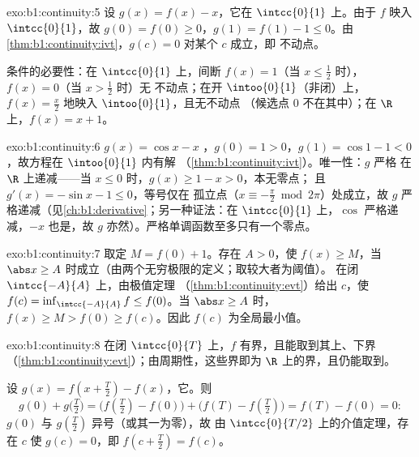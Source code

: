 \begin{solution}{exo:b1:continuity:5}
设 $g(x) = f(x) - x$，它在 $\intcc{0}{1}$ 上。由于 $f$ 映入
$\intcc{0}{1}$，故 $g(0) = f(0) \geq 0$，$g(1) = f(1) - 1 \leq
0$。由\cref{thm:b1:continuity:ivt}，$g(c) = 0$ 对某个 $c$ 成立，即
不动点。

条件的必要性：在 $\intcc{0}{1}$ 上，间断
$f(x) = 1$（当 $x \leq \frac12$ 时），$f(x) = 0$（当 $x > \frac12$ 时）无
不动点；在开 $\intoo{0}{1}$（非闭）上，$f(x) =
\frac x2$ 地映入 $\intoo{0}{1}$，且无不动点
（候选点 $0$ 不在其中）；在 $\R$ 上，$f(x) = x + 1$。
\end{solution}

\begin{solution}{exo:b1:continuity:6}
$g(x) = \cos x - x$ ，$g(0) = 1 > 0$，$g(1) = \cos 1 -
1 < 0$，故方程在 $\intoo{0}{1}$ 内有解
（\cref{thm:b1:continuity:ivt}）。唯一性：$g$ 严格
在 $\R$ 上递减——当 $x \leq 0$ 时，$g(x) \geq 1 - x > 0$，本无零点；
且 $g'(x) = -\sin x - 1 \leq 0$，等号仅在
孤立点（$x \equiv -\frac\pi2 \bmod 2\pi$）处成立，故 $g$
严格递减（见\cref{ch:b1:derivative}；另一种证法：在
$\intcc{0}{1}$ 上，$\cos$ 严格递减，$-x$ 也是，故 $g$
亦然）。严格单调函数至多只有一个零点。
\end{solution}

\begin{solution}{exo:b1:continuity:7}
取定 $M = f(0) + 1$。存在 $A > 0$，使 $f(x) \geq M$，当 $\abs x
\geq A$ 时成立（由两个无穷极限的定义；取较大者为阈值）。
在闭 $\intcc{-A}{A}$ 上，由极值定理
（\cref{thm:b1:continuity:evt}）给出 $c$，使 $f(c) =
\inf_{\intcc{-A}{A}} f \leq f(0)$。当 $\abs x \geq A$ 时，$f(x) \geq M
> f(0) \geq f(c)$。因此 $f(c)$ 为全局最小值。
\end{solution}

\begin{solution}{exo:b1:continuity:8}
在闭 $\intcc{0}{T}$ 上，$f$ 有界，且能取到其上、下界
（\cref{thm:b1:continuity:evt}）；由周期性，这些界即为
$\R$ 上的界，且仍能取到。

设 $g(x) = f(x + \frac T2) - f(x)$，它。则
\[
g(0) + g\bigl(\tfrac T2\bigr)
= \bigl(f(\tfrac T2) - f(0)\bigr) + \bigl(f(T) - f(\tfrac T2)\bigr)
= f(T) - f(0) = 0 :
\]
$g(0)$ 与 $g(\frac T2)$ 异号（或其一为零），故
由 $\intcc{0}{T/2}$ 上的介值定理，存在 $c$ 使
$g(c) = 0$，即 $f(c + \frac T2) = f(c)$。
\end{solution}

